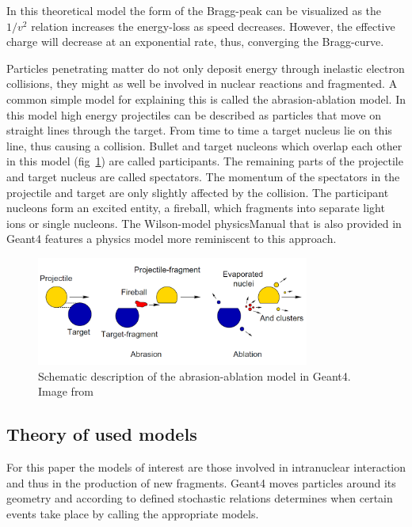 In this theoretical model the form of the Bragg-peak can be visualized as the $1/v^2$ relation increases the energy-loss as speed decreases. However, the effective charge will decrease at an exponential rate, thus, converging the Bragg-curve.

Particles penetrating matter do not only deposit energy through inelastic electron collisions, they might as well be involved in nuclear reactions and fragmented. A common simple model for explaining this is called the abrasion-ablation model. In this model high energy projectiles can be described as particles that move on straight lines through the
target. From time to time a target nucleus lie on this line, thus causing a collision. Bullet
and target nucleons which overlap each other in this model (fig~\ref{fig:ablationabration}) are called participants. The remaining parts of the projectile and target nucleus are called spectators. The momentum of the spectators in the projectile and target are only slightly affected by the collision. The participant nucleons form an excited entity, a fireball, which fragments into separate light ions or single nucleons.
The Wilson-model {physicsManual} that is also provided in Geant4 features a physics model more reminiscent to this approach.
\begin{figure}[h]
\begin{center}
\includegraphics[width=0.8\textwidth]{images/ablationabration.png}  
\caption{Schematic description of the abrasion-ablation model in Geant4.~\cite{physicsManual} Image from~\cite{gunzert-marx}} %
 \label{fig:ablationabration}
 \end{center}
 \end{figure}



\subsection{Theory of used models} %

For this paper the models of interest are those involved in intranuclear interaction and thus in the production of new fragments. Geant4 moves particles around its geometry and according to defined stochastic relations determines when certain events take place by calling the appropriate models.

